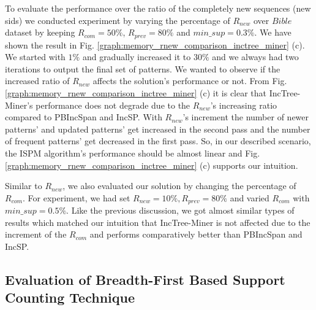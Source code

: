 To evaluate the performance over the ratio of the completely new sequences (new sids) we conducted experiment by varying the percentage of $R_{new}$ over $Bible$ dataset by keeping $R_{com}=50\%$, $R_{prev}=80\%$ and $min\_sup=0.3\%$. We have shown the result in Fig. \ref{graph:memory_rnew_comparison_inctree_miner} (c). We started with $1\%$ and gradually increased it to $30\%$ and we always had two iterations to output the final set of patterns. We wanted to observe if the increased ratio of $R_{new}$ affects the solution's performance or not. From Fig. \ref{graph:memory_rnew_comparison_inctree_miner} (c) it is clear that IncTree-Miner's performance does not degrade due to the $R_{new}$'s increasing ratio compared to PBIncSpan and IncSP. With $R_{new}$'s increment the number of newer patterns' and updated patterns' get increased in the second pass and the number of frequent patterns' get decreased in the first pass. So, in our described scenario, the ISPM algorithm's performance should be almost linear and Fig. \ref{graph:memory_rnew_comparison_inctree_miner} (c) supports our intuition.



Similar to $R_{new}$, we also evaluated our solution by changing the percentage of $R_{com}$. For experiment, we had set $R_{new}=10\%, R_{prev}=80\%$ and varied $R_{com}$ with $min\_sup=0.5\%$. Like the previous discussion, we got almost similar types of results which matched our intuition that IncTree-Miner is not affected due to the increment of the $R_{com}$ and performs comparatively better than PBIncSpan and IncSP.






\subsection{Evaluation of Breadth-First Based Support Counting Technique}


